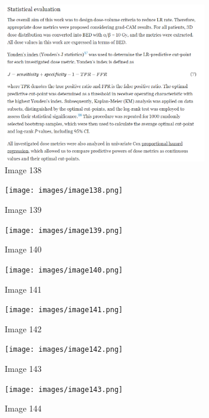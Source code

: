 \documentclass{article}%
\begin{document}
\begin{figure}[h!]%
\centering%
\includegraphics[width=0.8\textwidth]{images/image137.png}%
\caption{Image 138}%
\end{figure}

%


\begin{figure}[h!]%
\centering%
\texttt{[image: images/image138.png]}%
\caption{Image 139}%
\end{figure}

%


\begin{figure}[h!]%
\centering%
\texttt{[image: images/image139.png]}%
\caption{Image 140}%
\end{figure}

%


\begin{figure}[h!]%
\centering%
\texttt{[image: images/image140.png]}%
\caption{Image 141}%
\end{figure}

%


\begin{figure}[h!]%
\centering%
\texttt{[image: images/image141.png]}%
\caption{Image 142}%
\end{figure}

%


\begin{figure}[h!]%
\centering%
\texttt{[image: images/image142.png]}%
\caption{Image 143}%
\end{figure}

%


\begin{figure}[h!]%
\centering%
\texttt{[image: images/image143.png]}%
\caption{Image 144}%
\end{figure}
\end{document}
